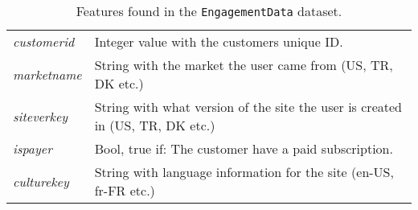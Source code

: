 \begin{table}[H]
\begin{tabularx}{\textwidth}{l|X}
        \textit{customerid}                      & Integer value with the customers unique ID.                                                                \\
        \textit{marketname}                      & String with the market the user came from (US, TR, DK etc.)                                                \\
        \textit{siteverkey}                      & String with what version of the site the user is created in (US, TR, DK etc.)                              \\
        \textit{ispayer}                         & Bool, true if: The customer have a paid subscription.                                                      \\
        \textit{culturekey}                      & String with language information for the site (en-US, fr-FR etc.)
    \end{tabularx}
    \caption{Features found in the \texttt{EngagementData} dataset.}
    \label{tab:engdatalayout}
\end{table}


